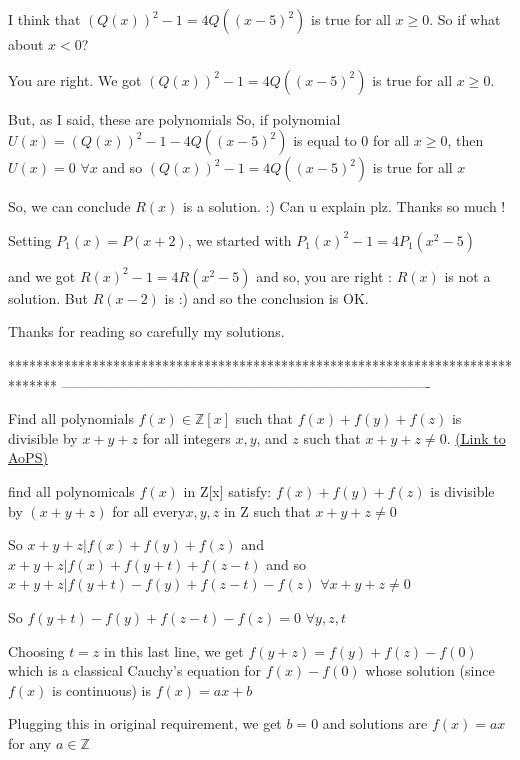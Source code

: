 \begin{solution}
	\begin{tcolorbox} I think that $ (Q(x))^2 - 1 = 4Q((x - 5)^2)$ is true for all $ x\geq 0.$ So if what about $ x < 0$?\end{tcolorbox}

You are right. We got $ (Q(x))^2 - 1 = 4Q((x - 5)^2)$ is true for all $ x\geq 0.$

But, as I said, these are polynomials So, if polynomial $ U(x) = (Q(x))^2 - 1 - 4Q((x - 5)^2)$ is equal to $ 0$ for all $ x\ge 0$, then $ U(x) = 0$ $ \forall x$ and so $ (Q(x))^2 - 1 = 4Q((x - 5)^2)$ is true for all $ x$

\begin{tcolorbox} So, we can conclude $ R(x)$ is a solution. :) Can u explain plz. Thanks so much !\end{tcolorbox}

Setting $ P_1(x) = P(x + 2)$, we started with $ P_1(x)^2 - 1 = 4P_1(x^2 - 5)$

and we got $ R(x)^2 - 1 = 4R(x^2 - 5)$ and so, you are right : $ R(x)$ is not a solution. But $ R(x - 2)$ is :) and so the conclusion is OK.

Thanks for reading so carefully my solutions.
\end{solution}
*******************************************************************************
-------------------------------------------------------------------------------

\begin{problem}
	Find all polynomials $ f(x) \in \mathbb Z[x]$ such that $f(x) + f(y) + f(z)$ is divisible by $ x + y + z$ for all integers $ x,y$, and $z$ such that $x+y+z\neq 0$.
	\flushright \href{https://artofproblemsolving.com/community/c6h324874}{(Link to AoPS)}
\end{problem}



\begin{solution}
	\begin{tcolorbox}find all polynomicals $ f(x)$ in Z[x] satisfy:
$ f(x) + f(y) + f(z)$ is divisible by $ (x + y + z)$ for all every$ x,y,z$ in Z such that $ x+y+z\ne 0$\end{tcolorbox}

So $ x+y+z|f(x)+f(y)+f(z)$ and $ x+y+z|f(x)+f(y+t)+f(z-t)$ and so $ x+y+z|f(y+t)-f(y)+f(z-t)-f(z)$ $ \forall x+y+z\ne 0$

So $ f(y+t)-f(y)+f(z-t)-f(z)=0$ $ \forall y,z,t$

Choosing $ t=z$ in this last line, we get $ f(y+z)=f(y)+f(z)-f(0)$ which is a classical Cauchy's equation for $ f(x)-f(0)$ whose solution (since $ f(x)$ is continuous) is $ f(x)=ax+b$

Plugging this in original requirement, we get $ b=0$ and solutions are $ \boxed{f(x)=ax}$ for any $ a\in\mathbb Z$
\end{solution}



